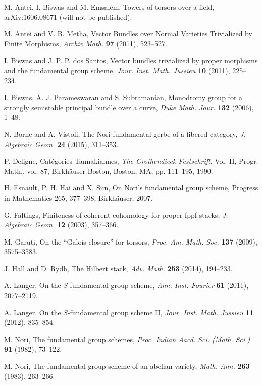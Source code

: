 \documentclass[12pt,reqno]{amsart}
\theoremstyle{plain}
\theoremstyle{definition}
\numberwithin{thm}{section}
\theoremstyle{plain}
\begin{document}
\begin{thebibliography}{9999999}

 M. Antei, I. Biswas and M. Emsalem, Towers of torsors over a 
field, arXiv:1606.08671 (will not be published).

 M. Antei and V. B. Metha, Vector Bundles over Normal Varieties 
Trivialized by Finite Morphisms, {\it Archiv Math.} {\bf 97} (2011), 523--527.

 I. Biswas and J. P. P. dos Santos, Vector bundles trivialized by 
proper morphisms and the fundamental group scheme, {\it Jour. Inst. Math. 
Jussieu} {\bf 10} (2011), 225--234.

 I. Biswas, A. J. Parameswaran and S. Subramanian, Monodromy group for 
a strongly semistable principal bundle over a curve, {\it Duke Math. Jour.} {\bf 132} 
(2006), 1--48.

 N. Borne and A. Vistoli, The Nori fundamental gerbe of a fibered 
category, {\it J. Algebraic Geom.} {\bf 24} (2015), 311--353.

 P. Deligne, Cat\'egories Tannakiannes, {\it The Grothendieck 
Festschrift}, Vol. II, Progr. Math., vol. 87, Birkh\"auser Boston, Boston, MA, pp. 
111--195, 1990.

 H. Esnault, P. H. Hai and X. Sun, On Nori's fundamental group 
scheme, Progress in Mathematics 265, 377--398, Birkh\"auser, 2007.

 G. Faltings, Finiteness of coherent cohomology for proper fppf 
stacks, {\it J. Algebraic Geom.} {\bf 12} (2003), 357--366.

 M. Garuti, On the ``Galois closure'' for torsors, {\it Proc. 
Am. Math. Soc.} {\bf 137} (2009), 3575--3583.

 J. Hall and D. Rydh, The Hilbert stack, {\it Adv. Math.} {\bf 253} 
(2014), 194--233.

 A. Langer, On the $S$-fundamental group scheme, 
{\it Ann. Inst. Fourier} {\bf 61} (2011), 2077--2119.

 A. Langer, On the $S$-fundamental group scheme II, {\it Jour. 
Inst. Math. Jussieu} {\bf 11} (2012), 835--854. 

 M. Nori, The fundamental group schemes,
{\it Proc. Indian Aacd. Sci. (Math. Sci.)} {\bf 91} (1982), 73--122.

 M. Nori, The fundamental group-scheme of an abelian variety,
{\it Math. Ann.} {\bf 263} (1983), 263--266.


\end{thebibliography}
\end{document}
